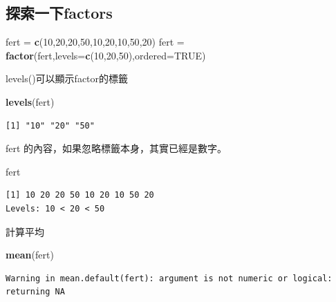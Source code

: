 \documentclass[]{book}
\newenvironment{Shaded}{\begin{snugshade}}{\end{snugshade}}
\newcommand{\DataTypeTok}[1]{\textcolor[rgb]{0.13,0.29,0.53}{#1}}
\newcommand{\DecValTok}[1]{\textcolor[rgb]{0.00,0.00,0.81}{#1}}
\newcommand{\KeywordTok}[1]{\textcolor[rgb]{0.13,0.29,0.53}{\textbf{#1}}}
\newcommand{\NormalTok}[1]{#1}
\newcommand{\OtherTok}[1]{\textcolor[rgb]{0.56,0.35,0.01}{#1}}
\newcommand{\StringTok}[1]{\textcolor[rgb]{0.31,0.60,0.02}{#1}}
\theoremstyle{definition}
\theoremstyle{definition}
\theoremstyle{definition}
\theoremstyle{remark}
\begin{document}
\hypertarget{factors}{%
\subsection{探索一下factors}\label{factors}}

\begin{Shaded}
\begin{Highlighting}[]
\NormalTok{fert =}\StringTok{ }\KeywordTok{c}\NormalTok{(}\DecValTok{10}\NormalTok{,}\DecValTok{20}\NormalTok{,}\DecValTok{20}\NormalTok{,}\DecValTok{50}\NormalTok{,}\DecValTok{10}\NormalTok{,}\DecValTok{20}\NormalTok{,}\DecValTok{10}\NormalTok{,}\DecValTok{50}\NormalTok{,}\DecValTok{20}\NormalTok{)}
\NormalTok{fert =}\StringTok{ }\KeywordTok{factor}\NormalTok{(fert,}\DataTypeTok{levels=}\KeywordTok{c}\NormalTok{(}\DecValTok{10}\NormalTok{,}\DecValTok{20}\NormalTok{,}\DecValTok{50}\NormalTok{),}\DataTypeTok{ordered=}\OtherTok{TRUE}\NormalTok{)}
\end{Highlighting}
\end{Shaded}

levels()可以顯示factor的標籤

\begin{Shaded}
\begin{Highlighting}[]
\KeywordTok{levels}\NormalTok{(fert)}
\end{Highlighting}
\end{Shaded}

\begin{verbatim}
[1] "10" "20" "50"
\end{verbatim}

fert 的內容，如果忽略標籤本身，其實已經是數字。

\begin{Shaded}
\begin{Highlighting}[]
\NormalTok{fert}
\end{Highlighting}
\end{Shaded}

\begin{verbatim}
[1] 10 20 20 50 10 20 10 50 20
Levels: 10 < 20 < 50
\end{verbatim}

計算平均

\begin{Shaded}
\begin{Highlighting}[]
\KeywordTok{mean}\NormalTok{(fert)}
\end{Highlighting}
\end{Shaded}

\begin{verbatim}
Warning in mean.default(fert): argument is not numeric or logical:
returning NA
\end{verbatim}
\end{document}
